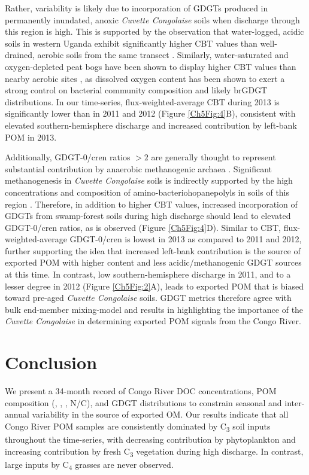 Rather, variability is likely due to incorporation of GDGTs produced in permanently inundated, anoxic \textit{Cuvette Congolaise} soils when discharge through this region is high. This is supported by the observation that water-logged, acidic soils in western Uganda exhibit significantly higher CBT values than well-drained, aerobic soils from the same transect \citep{Loomis:2011dr}. Similarly, water-saturated and oxygen-depleted peat bogs have been shown to display higher CBT values than nearby aerobic sites \citep{Huguet:2010di}, as dissolved oxygen content has been shown to exert a strong control on bacterial community composition \citep{Hansel:2008hp} and likely brGDGT distributions. In our time-series, flux-weighted-average CBT during 2013 is significantly lower than in 2011 and 2012 (Figure \ref{Ch5Fig:4}B), consistent with elevated southern-hemisphere discharge and increased contribution by left-bank POM in 2013.

Additionally, GDGT-0/cren ratios $>2$ are generally thought to represent substantial contribution by anaerobic methanogenic archaea \citep{Blaga:2009ge}. Significant methanogenesis in \textit{Cuvette Congolaise} soils is indirectly supported by the high concentrations and  composition of amino-bacteriohopanepolyls in soils of this region \citep{Talbot:2014jd,SpencerJones:2015bn}. Therefore, in addition to higher CBT values, increased incorporation of GDGTs from swamp-forest soils during high discharge should lead to elevated GDGT-0/cren ratios, as is observed (Figure \ref{Ch5Fig:4}D). Similar to CBT, flux-weighted-average GDGT-0/cren is lowest in 2013 as compared to 2011 and 2012, further supporting the idea that increased left-bank contribution is the source of exported POM with higher  content and less acidic/methanogenic GDGT sources at this time. In contrast, low southern-hemisphere discharge in 2011, and to a lesser degree in 2012 (Figure \ref{Ch5Fig:2}A), leads to exported POM that is biased toward pre-aged \textit{Cuvette Congolaise} soils. GDGT metrics therefore agree with bulk end-member mixing-model and  results in highlighting the importance of the \textit{Cuvette Congolaise} in determining exported POM signals from the Congo River.

\section{Conclusion}

We present a 34-month record of Congo River DOC concentrations, POM composition (, , , N/C), and GDGT distributions to constrain seasonal and inter-annual variability in the source of exported OM. Our results indicate that all Congo River POM samples are consistently dominated by C\textsubscript{3} soil inputs throughout the time-series, with decreasing contribution by phytoplankton and increasing contribution by fresh C\textsubscript{3} vegetation during high discharge. In contrast, large inputs by C\textsubscript{4} grasses are never observed.

